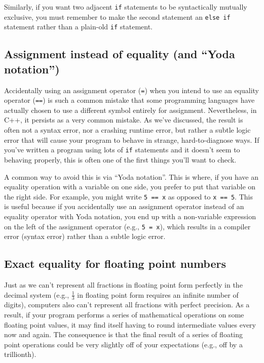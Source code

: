 \documentclass{article}
\begin{document}
Similarly, if you want two adjacent \texttt{if} statements to be syntactically mutually exclusive, you must remember to make the second statement an \texttt{else if} statement rather than a plain-old \texttt{if} statement.

\subsection{Assignment instead of equality (and ``Yoda notation'')}

Accidentally using an assignment operator (\texttt{=}) when you intend to use an equality operator (\texttt{==}) is such a common mistake that some programming languages have actually chosen to use a different symbol entirely for assignment. Nevertheless, in C++, it persists as a very common mistake. As we've discussed, the result is often not a syntax error, nor a crashing runtime error, but rather a subtle logic error that will cause your program to behave in strange, hard-to-diagnose ways. If you've written a program using lots of \texttt{if} statements and it doesn't seem to behaving properly, this is often one of the first things you'll want to check.

A common way to avoid this is via ``Yoda notation''. This is where, if you have an equality operation with a variable on one side, you prefer to put that variable on the right side. For example, you might write \texttt{5 == x} as opposed to \texttt{x == 5}. This is useful because if you accidentally use an assignment operator instead of an equality operator with Yoda notation, you end up with a non-variable expression on the left of the assignment operator (e.g., \texttt{5 = x}), which results in a compiler error (syntax error) rather than a subtle logic error.

\subsection{Exact equality for floating point numbers}

Just as we can't represent all fractions in floating point form perfectly in the decimal system (e.g., $\frac{1}{3}$ in floating point form requires an infinite number of digits), computers also can't represent all fractions with perfect precision. As a result, if your program performs a series of mathematical operations on some floating point values, it may find itself having to round intermediate values every now and again. The consequence is that the final result of a series of floating point operations could be very slightly off of your expectations (e.g., off by a trillionth).
\end{document}

